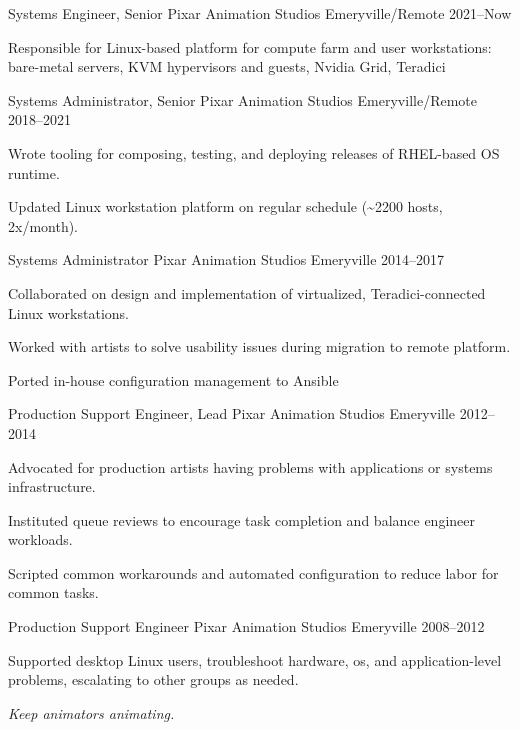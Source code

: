 
\begin{cventries}

  \cventry
  {Systems Engineer, Senior}  %
  {Pixar Animation Studios}  %
  {Emeryville/Remote}  %
  {2021--Now}  %
  {
    \begin{cvitems}  %
    \item {Responsible for Linux-based platform for compute farm and user workstations:  bare-metal servers, KVM hypervisors and guests, Nvidia Grid, Teradici }
    \end{cvitems}
  }

  \cventry
  {Systems Administrator, Senior}  %
  {Pixar Animation Studios}  %
  {Emeryville/Remote}  %
  {2018--2021}  %
  {
    \begin{cvitems}  %
    \item {Wrote tooling for composing, testing, and deploying releases of RHEL-based OS runtime.}
    \item {Updated Linux workstation platform on regular schedule (\textasciitilde{}2200 hosts, 2x/month).}
    \end{cvitems}
  }

  \cventry
  {Systems Administrator}
  {Pixar Animation Studios}
  {Emeryville}
  {2014--2017}
  {
    \begin{cvitems}
    \item {Collaborated on design and implementation of virtualized, Teradici-connected Linux workstations.}
    \item {Worked with artists to solve usability issues during migration to remote platform.}
    \item {Ported in-house configuration management to Ansible}
    \end{cvitems}
  }

  \cventry
  {Production Support Engineer, Lead}
  {Pixar Animation Studios}
  {Emeryville}
  {2012--2014}
  {
    \begin{cvitems}
    \item {Advocated for production artists having problems with applications or systems infrastructure.}
    \item {Instituted queue reviews to encourage task completion and balance engineer workloads.}
    \item {Scripted common workarounds and automated configuration to reduce labor for common tasks.}
    \end{cvitems}
  }

  \cventry
  {Production Support Engineer}
  {Pixar Animation Studios}
  {Emeryville}
  {2008--2012}
  {
    \begin{cvitems}
    \item {Supported desktop Linux users, troubleshoot hardware, os, and application-level problems, escalating to other groups as needed.}
    \item {\textit{Keep animators animating.}}
    \end{cvitems}
  }

\end{cventries}
